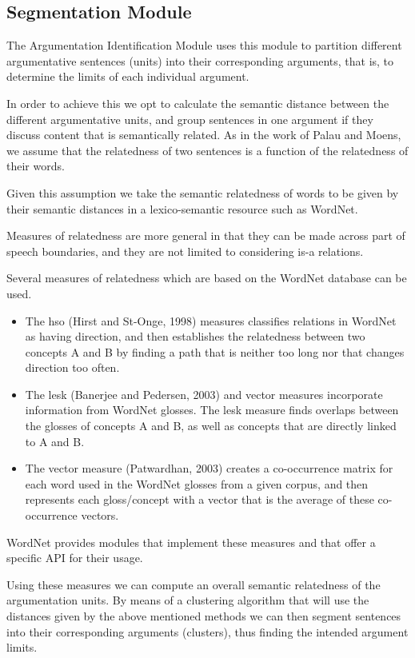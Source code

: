 \subsection{Segmentation Module}
\par
The Argumentation Identification Module uses this module to partition different argumentative sentences (units) into their corresponding arguments, that is, to determine the limits of each individual argument.
\par
In order to achieve this we opt to calculate the semantic distance between the different argumentative units, and group sentences in one argument if they discuss content that is semantically related. As in the work of Palau and Moens, we assume that the relatedness of two sentences is a function of the relatedness of their words.
\par
Given this assumption we take the semantic relatedness of words to be given by their semantic distances in a lexico-semantic resource such as WordNet.
\par
Measures of relatedness are more general in that they can be made across part of speech boundaries, and they are not limited to considering is-a relations.
\par
Several measures of relatedness which are based on the WordNet database can be used.
\begin{itemize}
\item The hso (Hirst and St-Onge, 1998) measures classifies relations in WordNet as having direction, and then establishes the relatedness between two concepts A and B by finding a path that is neither too long nor that changes direction too often. 
\item The lesk (Banerjee and Pedersen, 2003) and vector measures incorporate information from WordNet glosses. The lesk measure finds overlaps between the glosses of concepts A and B, as well as concepts that are directly linked to A and B. 
\item The vector measure (Patwardhan, 2003) creates a co-occurrence matrix for each word used in the WordNet glosses from a given corpus, and then represents each gloss/concept with a vector that is the average of these co-occurrence vectors.
\end{itemize}
\par
WordNet provides modules that implement these measures and that offer a specific API for their usage.
\par
Using these measures we can compute an overall semantic relatedness of the argumentation units. By means of a clustering algorithm that will use the distances given by the above mentioned methods we can then segment sentences into their corresponding arguments (clusters), thus finding the intended argument limits.

